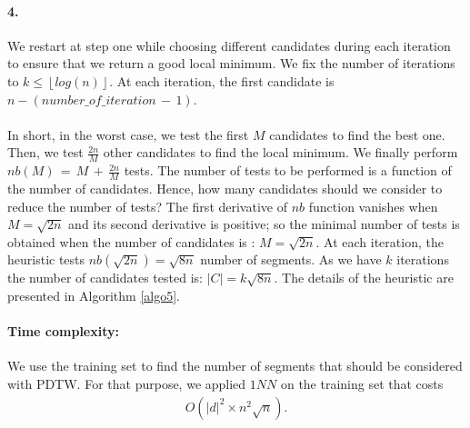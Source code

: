\begin{center}
\end{center}
\paragraph{4.} We restart at step one while choosing
different candidates during each iteration to ensure that we return a good
local minimum. We fix the number of iterations to $k \leq \left\lfloor log(n)\right\rfloor $. At each iteration, the first candidate is $n-(number \_ of \_ iteration \,-\, 1)$.


\paragraph{}In short, in the worst case, we test the first $M$ candidates to find the best one.
Then, we test $\frac{2n}{M}$ other candidates to find the local minimum.
We finally perform $nb(M)\, =\, M\, +\, \frac{2n}{M}$ tests. The number of tests
 to be performed is a function of the number of candidates. Hence, how many
candidates should we consider to reduce the number of tests? The first
derivative of $nb$ function  vanishes when $M=\sqrt{2n}$ and its second derivative is
positive; so the minimal number of tests is obtained when the number of candidates is : 
$M=\sqrt{2n}$. At each
iteration, the heuristic tests $nb(\sqrt{2n})=\sqrt{8n}$ number of segments. As we have $k$
iterations the number of candidates tested is: $|C|=k\sqrt{8n}$. The details of the heuristic are presented in Algorithm \ref{algo5}.

\paragraph{Time complexity: }
We use the training set to find the number of segments that should be considered
with PDTW. For that purpose, we applied $1NN$ on the training set that costs
\begin{eqnarray}
O(|d|^{2} \times n^{2}\sqrt{n}).
\end{eqnarray}


